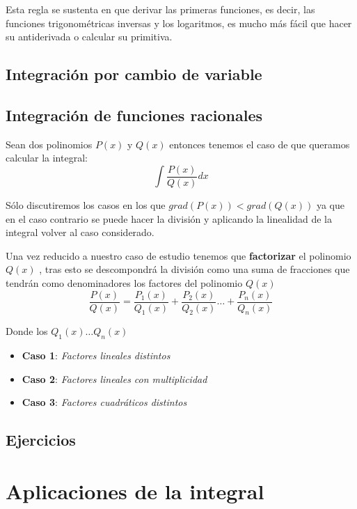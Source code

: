 Esta regla se sustenta en que derivar las primeras funciones, es decir, las funciones trigonométricas inversas y los logaritmos,  es mucho más fácil que hacer su antiderivada o calcular su primitiva. 

\subsection{Integración por cambio de variable}

\subsection{Integración de funciones racionales}
Sean dos polinomios $P(x)$ y $Q(x)$ entonces tenemos el caso de que queramos calcular la integral: 
$$
\int \dfrac{P(x)}{Q(x)}dx
$$

Sólo discutiremos los casos en los que $grad(P(x))< grad(Q(x))$ ya que en el caso contrario se puede hacer la división y aplicando la linealidad de la integral volver al caso considerado. 

Una vez reducido a nuestro caso de estudio tenemos que \textbf{factorizar} el polinomio $Q(x)$ , tras esto se descompondrá la división como una suma de fracciones que tendrán como denominadores los factores del polinomio $Q(x)$
\begin{equation}
\dfrac{P(x)}{Q(x)}=\dfrac{P_1(x)}{Q_1(x)}+\dfrac{P_2(x)}{Q_2(x)}\ldots +\dfrac{P_n(x)}{Q_n(x)}
\end{equation} 

Donde los $Q_1(x)\ldots Q_n(x)$
\begin{itemize}
\item \textbf{Caso 1}: \textit{Factores lineales distintos }
\item \textbf{Caso 2}: \textit{Factores lineales con multiplicidad}
\item \textbf{Caso 3}: \textit{Factores cuadráticos distintos}
\end{itemize}
\subsection{Ejercicios}
\section{Aplicaciones de la integral}



